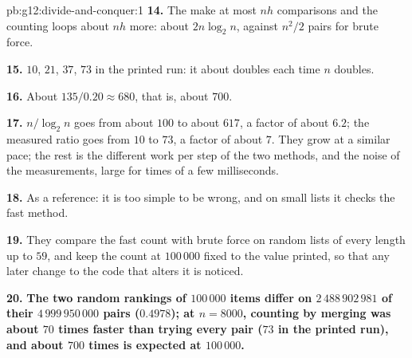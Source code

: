 \begin{solution}{pb:g12:divide-and-conquer:1}
\textbf{14.} The  make at most $n h$ comparisons and the counting loops about $n h$ more: about
$2 n \log_2 n$, against $n^2 / 2$ pairs for brute force.

\textbf{15.} $10$, $21$, $37$, $73$ in the printed run: it about doubles each time $n$ doubles.

\textbf{16.} About $135 / 0.20 \approx 680$, that is, about $700$.

\textbf{17.} $n / \log_2 n$ goes from about $100$ to about $617$, a factor of about $6.2$; the measured ratio goes from
$10$ to $73$, a factor of about $7$. They grow at a similar pace; the rest is the different work per step of the two
methods, and the noise of the measurements, large for times of a few milliseconds.

\textbf{18.} As a reference: it is too simple to be wrong, and on small lists it checks the fast method.

\textbf{19.} They compare the fast count with brute force on random lists of every length up to $59$, and keep the
count at $100\,000$ fixed to the value printed, so that any later change to the code that alters it is noticed.

\textbf{20.} \textbf{The two random rankings of $100\,000$ items differ on $2\,488\,902\,981$ of their
$4\,999\,950\,000$ pairs ($0.4978$); at $n = 8000$, counting by merging was about $70$ times faster than trying every pair
($73$ in the printed run), and about $700$ times is expected at $100\,000$.}
\end{solution}
